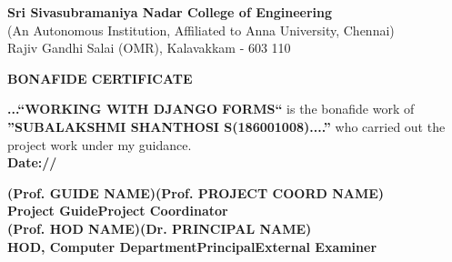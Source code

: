 \begin{center}
\thispagestyle{empty}
\vspace{10cm}
\LARGE{\textbf{Sri Sivasubramaniya Nadar College of Engineering }} \\ 
\normalsize{(An Autonomous Institution, Affiliated to Anna University, Chennai)} \\
Rajiv Gandhi Salai (OMR), Kalavakkam - 603 110 \\
\vspace{2cm}

{\Huge \textbf{BONAFIDE CERTIFICATE }}\\[0.5cm]
\end{center}
\linespread{1.13}
\large{
\textbf{...{``WORKING WITH DJANGO FORMS``}} \space is \space the \space bonafide \space work \space of \space \textbf{''SUBALAKSHMI SHANTHOSI S(186001008)....''} \space who carried out the project work under my
guidance. }\\[0.2cm]
\large{\textbf{Date:\hspace*{1.0cm}/\hspace*{1.0cm}/}}\\
\begin{spacing}{0}
\vspace{3.0cm}
\large{\textbf{(Prof. GUIDE NAME)}}\hspace*{1.2in}\large{\textbf{(Prof. PROJECT COORD NAME)}}\\
\hspace*{0.7in}\textbf{Project Guide}\hspace*{2.3in}\textbf{Project Coordinator}\\[3cm]
\hspace*{0.5cm}\large{\textbf{(Prof. HOD NAME)}}\hspace*{0.8in}\large{\textbf{(Dr. PRINCIPAL NAME)}}\\
\textbf{HOD, Computer Department}\hspace*{0.8in}\textbf{Principal}\hspace*{1.1in}\textbf{External Examiner}

\end{spacing}

